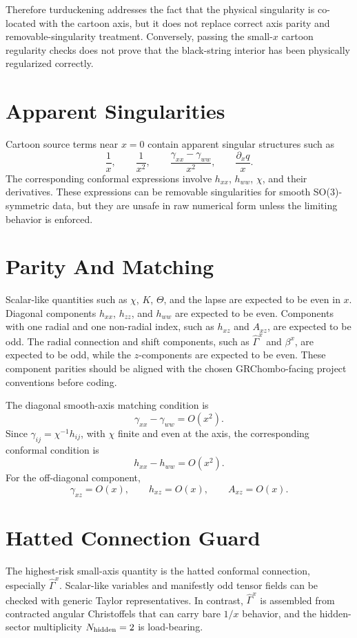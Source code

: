 \documentclass[11pt]{article}
\begin{document}
Therefore turduckening addresses the fact that the physical singularity is
co-located with the cartoon axis, but it does not replace correct axis parity
and removable-singularity treatment. Conversely, passing the small-\(x\)
cartoon regularity checks does not prove that the black-string interior has
been physically regularized correctly.

\section{Apparent Singularities}

Cartoon source terms near \(x=0\) contain apparent singular structures such as
\[
  \frac{1}{x},\qquad
  \frac{1}{x^2},\qquad
  \frac{\gamma_{xx}-\gamma_{ww}}{x^2},\qquad
  \frac{\partial_x q}{x}.
\]
The corresponding conformal expressions involve \(h_{xx}\), \(h_{ww}\),
\(\chi\), and their derivatives. These expressions can be removable
singularities for smooth SO(3)-symmetric data, but they are unsafe in raw
numerical form unless the limiting behavior is enforced.

\section{Parity And Matching}

Scalar-like quantities such as \(\chi\), \(K\), \(\Theta\), and the lapse are
expected to be even in \(x\). Diagonal components \(h_{xx}\), \(h_{zz}\), and
\(h_{ww}\) are expected to be even. Components with one radial and one
non-radial index, such as \(h_{xz}\) and \(A_{xz}\), are expected to be odd.
The radial connection and shift components, such as \(\hat{\Gamma}^x\) and
\(\beta^x\), are expected to be odd, while the \(z\)-components are expected to
be even. These component parities should be aligned with the chosen
GRChombo-facing project conventions before coding.

The diagonal smooth-axis matching condition is
\[
  \gamma_{xx}-\gamma_{ww}=O(x^2).
\]
Since \(\gamma_{ij}=\chi^{-1}h_{ij}\), with \(\chi\) finite and even at the
axis, the corresponding conformal condition is
\[
  h_{xx}-h_{ww}=O(x^2).
\]
For the off-diagonal component,
\[
  \gamma_{xz}=O(x),\qquad
  h_{xz}=O(x),\qquad
  A_{xz}=O(x).
\]

\section{Hatted Connection Guard}

The highest-risk small-axis quantity is the hatted conformal connection,
especially \(\hat{\Gamma}^x\). Scalar-like variables and manifestly odd tensor
fields can be checked with generic Taylor representatives. In contrast,
\(\hat{\Gamma}^x\) is assembled from contracted angular Christoffels that can
carry bare \(1/x\) behavior, and the hidden-sector multiplicity
\(N_{\rm hidden}=2\) is load-bearing.
\end{document}
